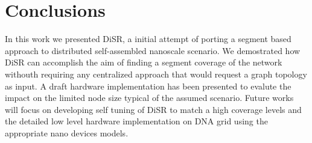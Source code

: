 \documentclass[final,journal,letterpaper]{IEEEtran}
\begin{document}







\section{Conclusions}
In this work we presented DiSR, a initial attempt of porting a segment based
approach to distributed self-assembled nanoscale scenario. We
demostrated how DiSR can accomplish the aim of finding a segment
coverage of the network withouth requiring any centralized approach
that would request a graph topology as input. A draft hardware
implementation has been presented to evalute the impact on the limited
node size typical of the assumed scenario. Future works will focus on
developing self tuning of DiSR to match a high coverage levels and the
detailed low level hardware implementation on
DNA grid using the appropriate nano devices models.


\balance

 


\end{document}
